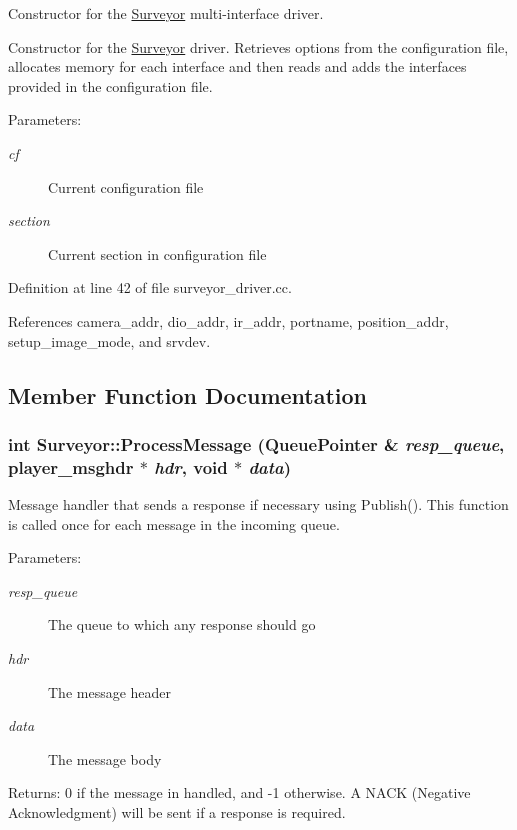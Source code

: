 Constructor for the \hyperlink{classSurveyor}{Surveyor} multi-interface driver. 

Constructor for the \hyperlink{classSurveyor}{Surveyor} driver. Retrieves options from the configuration file, allocates memory for each interface and then reads and adds the interfaces provided in the configuration file.

\begin{Desc}
\item[Parameters:]
\begin{description}
\item[{\em cf}]Current configuration file \item[{\em section}]Current section in configuration file \end{description}
\end{Desc}


Definition at line 42 of file surveyor\_\-driver.cc.

References camera\_\-addr, dio\_\-addr, ir\_\-addr, portname, position\_\-addr, setup\_\-image\_\-mode, and srvdev.

\subsection{Member Function Documentation}
\hypertarget{classSurveyor_9af107b9b363d15951303c3cbaf4328f}{
\subsubsection[{ProcessMessage}]{\setlength{\rightskip}{0pt plus 5cm}int Surveyor::ProcessMessage (QueuePointer \& {\em resp\_\-queue}, \/  player\_\-msghdr $\ast$ {\em hdr}, \/  void $\ast$ {\em data})}}
\label{classSurveyor_9af107b9b363d15951303c3cbaf4328f}


Message handler that sends a response if necessary using Publish(). This function is called once for each message in the incoming queue. 

\begin{Desc}
\item[Parameters:]
\begin{description}
\item[{\em resp\_\-queue}]The queue to which any response should go \item[{\em hdr}]The message header \item[{\em data}]The message body \end{description}
\end{Desc}
\begin{Desc}
\item[Returns:]0 if the message in handled, and -1 otherwise. A NACK (Negative Acknowledgment) will be sent if a response is required. \end{Desc}


